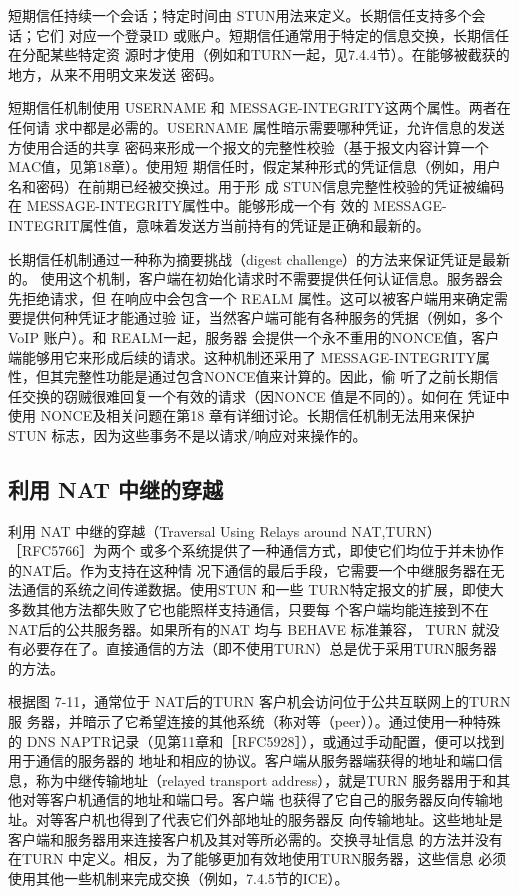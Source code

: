 短期信任持续一个会话；特定时间由 STUN用法来定义。长期信任支持多个会话；它们
对应一个登录ID 或账户。短期信任通常用于特定的信息交换，长期信任在分配某些特定资
源时才使用（例如和TURN一起，见7.4.4节）。在能够被截获的地方，从来不用明文来发送
密码。

短期信任机制使用 USERNAME 和 MESSAGE-INTEGRITY这两个属性。两者在任何请
求中都是必需的。USERNAME 属性暗示需要哪种凭证，允许信息的发送方使用合适的共享
密码来形成一个报文的完整性校验（基于报文内容计算一个MAC值，见第18章）。使用短
期信任时，假定某种形式的凭证信息（例如，用户名和密码）在前期已经被交换过。用于形
成 STUN信息完整性校验的凭证被编码在 MESSAGE-INTEGRITY属性中。能够形成一个有
效的 MESSAGE-INTEGRIT属性值，意味着发送方当前持有的凭证是正确和最新的。

长期信任机制通过一种称为摘要挑战（digest challenge）的方法来保证凭证是最新的。
使用这个机制，客户端在初始化请求时不需要提供任何认证信息。服务器会先拒绝请求，但
在响应中会包含一个 REALM 属性。这可以被客户端用来确定需要提供何种凭证才能通过验
证，当然客户端可能有各种服务的凭据（例如，多个 VoIP 账户）。和 REALM一起，服务器
会提供一个永不重用的NONCE值，客户端能够用它来形成后续的请求。这种机制还采用了
MESSAGE-INTEGRITY属性，但其完整性功能是通过包含NONCE值来计算的。因此，偷
听了之前长期信任交换的窃贼很难回复一个有效的请求（因NONCE 值是不同的）。如何在
凭证中使用 NONCE及相关问题在第18 章有详细讨论。长期信任机制无法用来保护 STUN
标志，因为这些事务不是以请求/响应对来操作的。

\subsection{利用 NAT 中继的穿越}

利用 NAT 中继的穿越（Traversal Using Relays around NAT,TURN） ［RFC5766］为两个
或多个系统提供了一种通信方式，即使它们均位于并未协作的NAT后。作为支持在这种情
况下通信的最后手段，它需要一个中继服务器在无法通信的系统之间传递数据。使用STUN
和一些 TURN特定报文的扩展，即使大多数其他方法都失败了它也能照样支持通信，只要每
个客户端均能连接到不在 NAT后的公共服务器。如果所有的NAT 均与 BEHAVE 标准兼容，
TURN 就没有必要存在了。直接通信的方法（即不使用TURN）总是优于采用TURN服务器
的方法。

根据图 7-11，通常位于 NAT后的TURN 客户机会访问位于公共互联网上的TURN服
务器，并暗示了它希望连接的其他系统（称对等（peer））。通过使用一种特殊的 DNS
NAPTR记录（见第11章和［RFC5928］），或通过手动配置，便可以找到用于通信的服务器的
地址和相应的协议。客户端从服务器端获得的地址和端口信息，称为中继传输地址（relayed
transport address），就是TURN 服务器用于和其他对等客户机通信的地址和端口号。客户端
也获得了它自己的服务器反向传输地址。对等客户机也得到了代表它们外部地址的服务器反
向传输地址。这些地址是客户端和服务器用来连接客户机及其对等所必需的。交换寻址信息
的方法并没有在TURN 中定义。相反，为了能够更加有效地使用TURN服务器，这些信息
必须使用其他一些机制来完成交换（例如，7.4.5节的ICE）。


